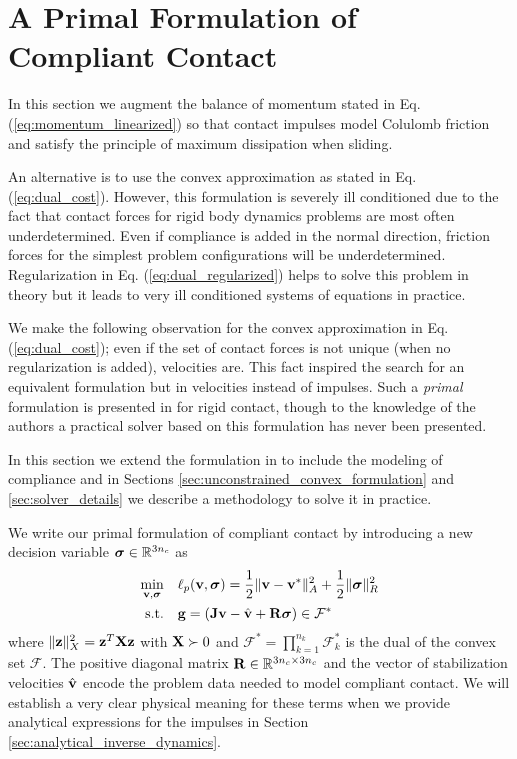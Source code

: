 
\section{A Primal Formulation of Compliant Contact}

In this section we augment the balance of momentum stated in Eq.
(\ref{eq:momentum_linearized}) so that contact impulses model Colulomb friction
and satisfy the principle of maximum dissipation when sliding. 

An alternative is to use the convex approximation as stated in Eq.
(\ref{eq:dual_cost}). However, this formulation is severely ill conditioned due
to the fact that contact forces for rigid body dynamics problems are most often
underdetermined. Even if compliance is added in the normal direction, friction
forces for the simplest problem configurations will be underdetermined.
Regularization in Eq. (\ref{eq:dual_regularized}) helps to solve this problem in
theory but it leads to very ill conditioned systems of equations in practice. 

We make the following observation for the convex approximation in Eq.
(\ref{eq:dual_cost}); even if the set of contact forces is not unique (when no
regularization is added), velocities are. This fact inspired the search
for an equivalent formulation but in velocities instead of impulses. Such a
\textit{primal} formulation is presented in \cite{bib:mazhar2014} for rigid
contact, though to the knowledge of the authors a practical solver based on this
formulation has never been presented.

In this section we extend the formulation in \cite{bib:mazhar2014} to include
the modeling of compliance and in Sections
\ref{sec:unconstrained_convex_formulation} and \ref{sec:solver_details} we
describe a methodology to solve it in practice.

We write our primal formulation of compliant contact by introducing a new
decision variable ${\bm{\sigma}}\in\mathbb{R}^{3n_c}$ as
\begin{equation}
	\begin{aligned}
	\min_{\mf{v},\bsigma} \quad & \ell_p(\mf{v},\bsigma) =
	\frac{1}{2}\Vert\mf{v}-\mf{v}^*\Vert_{A}^2 +
	\frac{1}{2} \Vert\bsigma\Vert_{R}^2\\
	\textrm{s.t.} \quad & \mf{g} = (\mf{J}\mf{v}-\hat{\mf{v}} + \mf{R}\bsigma) \in \mathcal{F}^*\\
	\end{aligned}
	\label{eq:primal_regularized}
\end{equation}
where $\Vert{\mathbf{z}}\Vert_X^2={\mathbf{z}}^T{\mathbf{X}}{\mathbf{z}}$ with ${\mathbf{X}}\succ 0$
and $\mathcal{F^*}=\prod_{k=1}^{n_k}\mathcal{F}^*_k$ is the dual of the convex
set $\mathcal{F}$. The positive diagonal matrix ${\mathbf{R}}\in\mathbb{R}^{3n_c\times
3n_c}$ and the vector of stabilization velocities $\hat{{\mathbf{v}}}$ encode the
problem data needed to model compliant contact. We will establish a very clear
physical meaning for these terms when we provide analytical expressions for the
impulses in Section \ref{sec:analytical_inverse_dynamics}.

